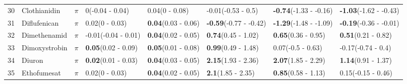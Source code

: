 \begin{longtable}{lp{2cm}p{0.7cm}p{2cm}p{2cm}p{2cm}p{2cm}p{2cm}}
  30 & Clothianidin & $\pi$ & 0\newline (-0.04 - 0.04) & 0.04\newline (0 - 0.08) & -0.01\newline (-0.53 - 0.5) & \textbf{-0.74}\newline (-1.33 - -0.16) & \textbf{-1.03}\newline (-1.62 - -0.43) \\ 
  31 & Diflufenican & $\pi$ & 0.02\newline (0 - 0.03) & \textbf{0.04}\newline (0.03 - 0.06) & \textbf{-0.59}\newline (-0.77 - -0.42) & \textbf{-1.29}\newline (-1.48 - -1.09) & \textbf{-0.19}\newline (-0.36 - -0.01) \\ 
  32 & Dimethenamid & $\pi$ & -0.01\newline (-0.04 - 0.01) & \textbf{0.04}\newline (0.02 - 0.05) & \textbf{0.74}\newline (0.45 - 1.02) & \textbf{0.65}\newline (0.36 - 0.95) & \textbf{0.51}\newline (0.21 - 0.82) \\ 
  33 & Dimoxystrobin & $\pi$ & \textbf{0.05}\newline (0.02 - 0.09) & \textbf{0.05}\newline (0.01 - 0.08) & \textbf{0.99}\newline (0.49 - 1.48) & 0.07\newline (-0.5 - 0.63) & -0.17\newline (-0.74 - 0.4) \\ 
  34 & Diuron & $\pi$ & \textbf{0.02}\newline (0.01 - 0.03) & \textbf{0.04}\newline (0.03 - 0.05) & \textbf{2.15}\newline (1.93 - 2.36) & \textbf{2.07}\newline (1.85 - 2.29) & \textbf{1.14}\newline (0.91 - 1.37) \\ 
  35 & Ethofumesat & $\pi$ & 0.02\newline (0 - 0.03) & \textbf{0.04}\newline (0.02 - 0.05) & \textbf{2.1}\newline (1.85 - 2.35) & \textbf{0.85}\newline (0.58 - 1.13) & 0.15\newline (-0.15 - 0.46) \\ 

\end{longtable}
